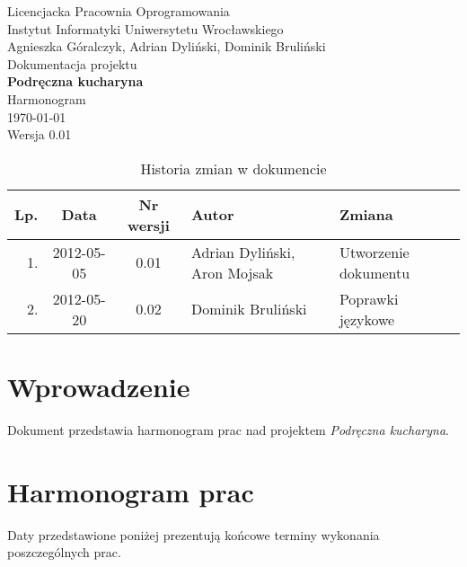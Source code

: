 \documentclass[12pt,leqno, twoside]{mwart}
\begin{document}
\thispagestyle{empty}
\begin{center}
Licencjacka Pracownia Oprogramowania \\ Instytut
Informatyki Uniwersytetu Wrocławskiego \\
\vspace{4cm}
\Large Agnieszka Góralczyk, Adrian Dyliński, Dominik Bruliński \\
\vspace{0.5cm}
\huge Dokumentacja projektu\\ \textbf{Podręczna kucharyna}\\ \Large Harmonogram\\
\vspace{1cm}
\normalsize \today \\
\vspace{2cm}
\normalsize Wersja 0.01
\end{center}

\newpage


\begin{table}
	\centering
	\caption{Historia zmian w dokumencie}
		\begin{tabular}{|r|c|c|l|l|}
		\hline
		Lp. & Data       & Nr wersji & Autor               & Zmiana \\ \hline
		1.   & 2012-05-05 & 0.01 & Adrian Dyliński, Aron Mojsak & Utworzenie dokumentu \\ \hline
		2.  & 2012-05-20 & 0.02 & Dominik Bruliński & Poprawki językowe \\ \hline
		\end{tabular}
\end{table}

\newpage

\tableofcontents
\newpage

\section{Wprowadzenie}
Dokument przedstawia harmonogram prac nad projektem \emph{Podręczna kucharyna}.

\section{Harmonogram prac}

Daty przedstawione poniżej prezentują końcowe terminy wykonania poszczególnych prac.
\end{document}
